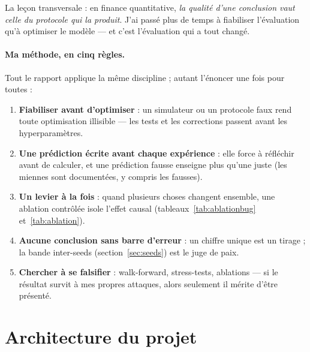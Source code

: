 \documentclass[11pt,a4paper]{article}
\begin{document}
La leçon transversale : en finance quantitative, \emph{la qualité d'une conclusion vaut
celle du protocole qui la produit}. J'ai passé plus de temps à fiabiliser l'évaluation
qu'à optimiser le modèle --- et c'est l'évaluation qui a tout changé.

\paragraph{Ma méthode, en cinq règles.} Tout le rapport applique la même discipline ;
autant l'énoncer une fois pour toutes :
\begin{enumerate}[itemsep=2pt]
  \item \textbf{Fiabiliser avant d'optimiser} : un simulateur ou un protocole faux rend
        toute optimisation illisible --- les tests et les corrections passent avant les
        hyperparamètres.
  \item \textbf{Une prédiction écrite avant chaque expérience} : elle force à réfléchir
        avant de calculer, et une prédiction fausse enseigne plus qu'une juste (les
        miennes sont documentées, y compris les fausses).
  \item \textbf{Un levier à la fois} : quand plusieurs choses changent ensemble, une
        ablation contrôlée isole l'effet causal (tableaux~\ref{tab:ablationbug}
        et~\ref{tab:ablation}).
  \item \textbf{Aucune conclusion sans barre d'erreur} : un chiffre unique est un
        tirage ; la bande inter-seeds (section~\ref{sec:seeds}) est le juge de paix.
  \item \textbf{Chercher à se falsifier} : walk-forward, stress-tests, ablations ---
        si le résultat survit à mes propres attaques, alors seulement il mérite d'être
        présenté.
\end{enumerate}

\section{Architecture du projet}
\end{document}
